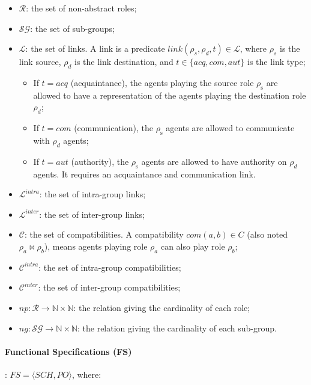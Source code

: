 \documentclass{ecai}
\newcounter{relation}
\begin{document}
\begin{itemize}
    \item $\mathcal{R}$: the set of non-abstract roles;

    \item $\mathcal{SG}$: the set of sub-groups;

    \item $\mathcal{L}$: the set of links. A link is a predicate $link(\rho_s,\rho_d,t) \in \mathcal{L}$, where $\rho_{s}$ is the link source, $\rho_{d}$ is the link destination, and $t \in\{acq, com, aut\}$ is the link type;
          \begin{itemize}
              \item If $t = acq$ (acquaintance), the agents playing the source role $\rho_{\mathrm{s}}$ are allowed to have a representation of the agents playing the destination role $\rho_{d}$;
              \item If $t = com$ (communication), the $\rho_{\mathrm{s}}$ agents are allowed to communicate with $\rho_{d}$ agents;
              \item If $t = aut$ (authority), the $\rho_{\mathrm{s}}$ agents are allowed to have authority on $\rho_{d}$ agents. It requires an acquaintance and communication link.
          \end{itemize}
    \item $\mathcal{L}^{intra}$: the set of intra-group links;
    \item $\mathcal{L}^{inter}$: the set of inter-group links;

    \item $\mathcal{C}$: the set of compatibilities. A compatibility $com(a,b) \in C$ (also noted $\rho_a \bowtie \rho_b$), means agents playing role $\rho_a$ can also play role $\rho_b$;
    \item $\mathcal{C}^{intra}$: the set of intra-group compatibilities;
    \item $\mathcal{C}^{inter}$: the set of inter-group compatibilities;

    \item $np: \mathcal{R} \rightarrow \mathbb{N} \times \mathbb{N}$: the relation giving the cardinality of each role;
    \item $ng: \mathcal{SG} \rightarrow \mathbb{N} \times \mathbb{N}$: the relation giving the cardinality of each sub-group.

\end{itemize}

\paragraph{\textbf{Functional Specifications (FS)}}: $FS = \langle SCH, PO \rangle$, where:
\end{document}
